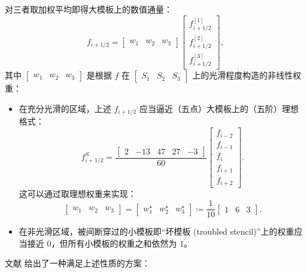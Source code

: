 对三者取加权平均即得大模板上的数值通量：
\begin{equation}
f_{i+1/2}=\begin{bmatrix}w_{1} & w_{2} & w_{3}\end{bmatrix}\begin{bmatrix}f_{i+1/2}^{[1]}\\
f_{i+1/2}^{[2]}\\
f_{i+1/2}^{[3]}
\end{bmatrix},
\end{equation}
其中 $\begin{bmatrix}w_{1} & w_{2} & w_{3}\end{bmatrix}$ 是根据 $f$ 在
$\begin{bmatrix}S_{1} & S_{2} & S_{3}\end{bmatrix}$ 上的光滑程度构造的非线性权重：
\begin{itemize}
\item 在充分光滑的区域，上述 $f_{i+1/2}$ 应当逼近（五点）大模板上的（五阶）理想格式：
\begin{equation}
f_{i+1/2}^{S}=\frac{\begin{bmatrix}2 & -13 & 47 & 27 & -3\end{bmatrix}}{60}\begin{bmatrix}f_{i-2}\\
f_{i-1}\\
f_{i}\\
f_{i+1}\\
f_{i+2}
\end{bmatrix}.
\end{equation}
这可以通过取理想权重来实现：
\begin{equation}
\begin{bmatrix}w_{1} & w_{2} & w_{3}\end{bmatrix}=\begin{bmatrix}w_{1}^{\star} & w_{2}^{\star} & w_{3}^{\star}\end{bmatrix}\coloneqq\frac{1}{10}\begin{bmatrix}1 & 6 & 3\end{bmatrix}.
\end{equation}
\item 在非光滑区域，被间断穿过的小模板即“坏模板 (troubled stencil)”上的权重应当接近 $0$，但所有小模板的权重之和依然为
$1$。
\end{itemize}
文献 \cite{Jiang_1996} 给出了一种满足上述性质的方案：
